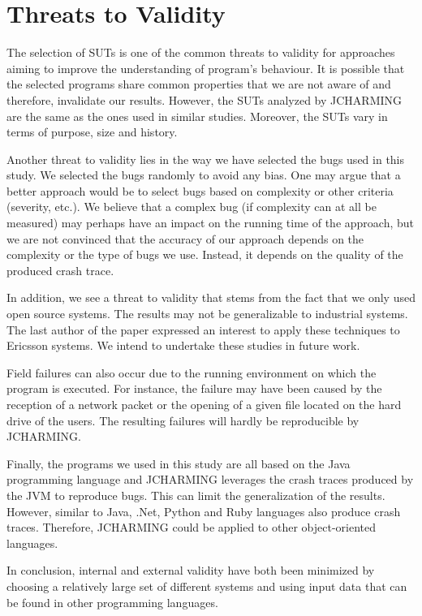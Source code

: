 \documentclass[times]{smrauth}
\begin{document}
\section{Threats to Validity\label{sec:threats}}

The selection of SUTs is one of the common threats to validity
for approaches aiming to improve the understanding of
program's behaviour. It is possible that the selected programs
share common properties that we are not aware of and
therefore, invalidate our results. However, the SUTs analyzed
by JCHARMING are the same as the ones used in similar
studies. Moreover, the SUTs vary in terms of purpose, size
and history.

Another threat to validity lies in the way we have selected the
bugs used in this study. We selected the bugs randomly to
avoid any bias. One may argue that a better approach would
be to select bugs based on complexity or other criteria
(severity, etc.). We believe that a complex bug (if complexity
can at all be measured) may perhaps have an impact on the
running time of the approach, but we are not convinced that
the accuracy of our approach depends on the complexity or the
type of bugs we use. Instead, it depends on the quality of the
produced crash trace.

In addition, we see a threat to validity that stems from the fact
that we only used open source systems. The results may not be
generalizable to industrial systems. The last author of the
paper expressed an interest to apply these techniques to
Ericsson systems. We intend to undertake these studies in
future work.

Field failures can also occur due to the running environment
on which the program is executed. For instance, the failure
may have been caused by the reception of a network packet or
the opening of a given file located on the hard drive of the
users. The resulting failures will hardly be reproducible by
JCHARMING.

Finally, the programs we used in this study are all based on
the Java programming language and JCHARMING leverages
the crash traces produced by the JVM to reproduce bugs. This
can limit the generalization of the results. However, similar to
Java, .Net, Python and Ruby languages also produce crash
traces. Therefore, JCHARMING could be applied to other
object-oriented languages.

In conclusion, internal and external validity have both been
minimized by choosing a relatively large set of different
systems and using input data that can be found in other
programming languages.
\end{document}
